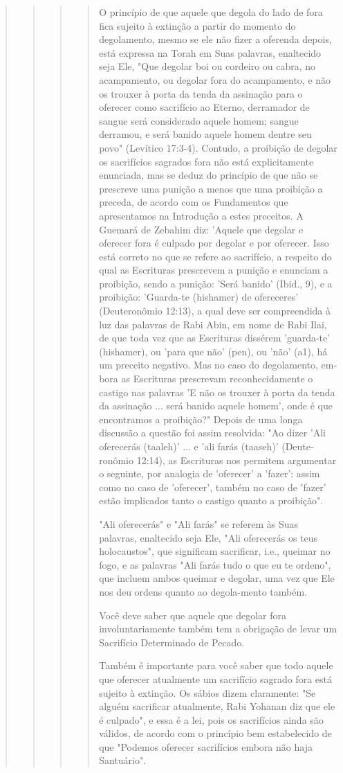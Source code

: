 \begin{quote}
\begin{quote}
\begin{quote}
\begin{quote}
O princípio de que aquele que degola do lado de fora fica sujeito à
extinção a partir do momento do degolamento, mesmo se ele não fizer a
oferen­da depois, está expressa na Torah em Suas palavras, enaltecido
seja Ele, "Que de­golar boi ou cordeiro ou cabra, no acampamento, ou
degolar fora do acampa­mento, e não os trouxer à porta da tenda da
assinação para o oferecer como sa­crifício ao Eterno, derramador de
sangue será considerado aquele homem; san­gue derramou, e será banido
aquele homem dentre seu povo" (Levítico 17:3-4). Contudo, a proibição de
degolar os sacrifícios sagrados fora não está explicita­mente enunciada,
mas se deduz do princípio de que não se prescreve uma puni­ção a menos
que uma proibição a preceda, de acordo com os Fundamentos que
apresentamos na Introdução a estes preceitos. A Guemará de Zebahim diz:
'Aquele que degolar e oferecer fora é culpado por degolar e por
oferecer. Isso está corre­to no que se refere ao sacrifício, a respeito
do qual as Escrituras prescrevem a punição 
e enunciam a proibição, sendo a punição: 'Será banido' (Ibid., 9),
e a proi­bição: 'Guarda-te (hishamer) de ofereceres' (Deuteronômio
12:13), a qual deve ser compreendida à luz das palavras de Rabi Abin, em
nome de Rabi Ilai, de que toda vez que as Escrituras dissérem
'guarda-te' (hishamer), ou 'para que não' (pen), ou 'não' (a1), há um
preceito negativo. Mas no caso do degolamento, em­bora as Escrituras
prescrevam reconhecidamente o castigo nas palavras 'E não os trouxer à
porta da tenda da assinação ... será banido aquele homem', onde é que
encontramos a proibição?" Depois de uma longa discussão a questão foi
assim resolvida: "Ao dizer 'Ali oferecerás (taaleh)' ... e 'ali farás
(taaseh)' (Deute­ronômio 12:14), as Escrituras nos permitem argumentar o
seguinte, por analo­gia de 'oferecer' a 'fazer': assim como no caso de
'oferecer', também no caso de 'fazer' estão implicados tanto o castigo
quanto a proibição".

"Ali oferecerás" e "Ali farás" se referem às Suas palavras, enaltecido
seja Ele, "Ali oferecerás os teus holocaustos", que significam
sacrificar, i.e., quei­mar no fogo, e as palavras "Ali farás tudo o que
eu te ordeno", que incluem ambos queimar e degolar, uma vez que Ele nos
deu ordens quanto ao degola-mento também.

Você deve saber que aquele que degolar fora involuntariamente tam­bém
tem a obrigação de levar um Sacrifício Determinado de Pecado.

Também é importante para você saber que todo aquele que ofere­cer
atualmente um sacrifício sagrado fora está sujeito à extinção. Os sábios
di­zem claramente: "Se alguém sacrificar atualmente, Rabi Yohanan diz
que ele é culpado", e essa é a lei, pois os sacrifícios ainda são
válidos, de acordo com o princípio bem estabelecido de que "Podemos
oferecer sacrifícios embora não haja Santuário".


\end{quote}
\end{quote}
\end{quote}
\end{quote}
